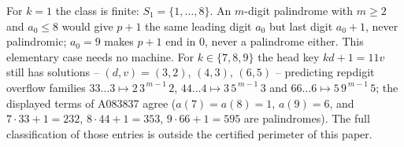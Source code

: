 \begin{remark}[the multipliers $k = 1$ and
$k \in \{7,8,9\}$]
\label{rem:k1}
For $k = 1$ the class is finite: $S_1 = \{1,\dots,8\}$.
An $m$-digit palindrome with $m \ge 2$ and $a_0 \le 8$
would give $p+1$ the same leading digit $a_0$ but last
digit $a_0+1$, never palindromic; $a_0 = 9$ makes $p+1$
end in $0$, never a palindrome either. This elementary
case needs no machine. For $k \in \{7,8,9\}$ the head
key $kd+1 = 11v$ still has solutions -- $(d,v) = (3,2)$,
$(4,3)$, $(6,5)$ -- predicting repdigit overflow families
$33\ldots3 \mapsto 2\,3^{\,m-1}\,2$,
$44\ldots4 \mapsto 3\,5^{\,m-1}\,3$ and
$66\ldots6 \mapsto 5\,9^{\,m-1}\,5$; the displayed terms
of A083837 agree ($a(7) = a(8) = 1$, $a(9) = 6$, and
$7\cdot33+1 = 232$, $8\cdot44+1 = 353$,
$9\cdot66+1 = 595$ are palindromes). The full
classification of those entries is outside the certified
perimeter of this paper.
\end{remark}
